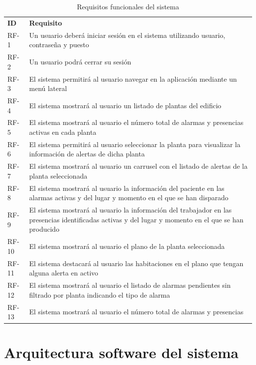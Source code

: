 \begin{table}[!h]
\centering
\begin{tabular}{|p{1cm}|p{14cm}|}
	\hline
	\textbf{ID} & \textbf{Requisito} \\
	RF-1 	& 	Un usuario deberá iniciar sesión en el sistema utilizando usuario, contraseña y puesto	\\
	\hline
	RF-2	&	Un usuario podrá cerrar su sesión	\\
	\hline
	RF-3	&	El sistema permitirá al usuario navegar en la aplicación mediante un menú lateral \\
	\hline
	RF-4	&	El sistema mostrará al usuario un listado de plantas del edificio \\
	\hline
	RF-5	&	El sistema mostrará al usuario el número total de alarmas y presencias activas en cada planta \\
	\hline
	RF-6	&	El sistema permitirá al usuario seleccionar la planta para visualizar la información de alertas de dicha planta \\
	\hline
	RF-7	&	El sistema mostrará al usuario un carrusel con el listado de alertas de la planta seleccionada \\
	\hline
	RF-8	&	El sistema mostrará al usuario la información del paciente en las alarmas activas y del lugar y momento en el que se han disparado \\
	\hline
	RF-9	&	El sistema mostrará al usuario la información del trabajador en las presencias identificadas activas y del lugar y momento en el que se han producido \\
	\hline
	RF-10	&	El sistema mostrará al usuario el plano de la planta seleccionada \\
	\hline
	RF-11	&	El sistema destacará al usuario las habitaciones en el plano que tengan alguna alerta en activo \\
	\hline
	RF-12	&	El sistema mostrará al usuario el listado de alarmas pendientes sin filtrado por planta indicando el tipo de alarma \\
	\hline
	RF-13	&	El sistema mostrará al usuario el número total de alarmas y presencias \\
	\hline
	\end{tabular}
\caption{Requisitos funcionales del sistema}
\label{tab:etiqueta_tabla}
\end{table}

\section{Arquitectura software del sistema}

